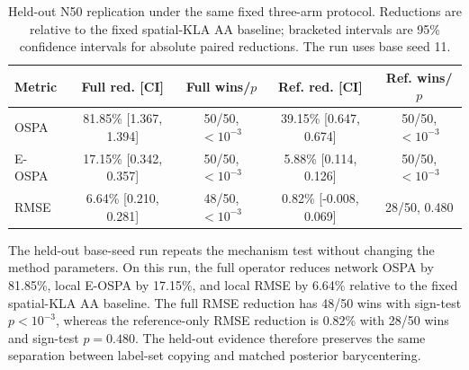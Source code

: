\begin{table}[t]
\caption{Held-out N50 replication under the same fixed three-arm protocol. Reductions are relative to the fixed spatial-KLA AA baseline; bracketed intervals are 95\% confidence intervals for absolute paired reductions. The run uses base seed 11.}
\label{tab:heldout}
\centering
\tablefont
\begin{tabular}{lcccc}
\toprule
Metric & Full red. [CI] & Full wins/$p$ & Ref. red. [CI] & Ref. wins/$p$\\
\midrule
OSPA & 81.85\% [1.367, 1.394] & 50/50, $<10^{-3}$ & 39.15\% [0.647, 0.674] & 50/50, $<10^{-3}$\\
E-OSPA & 17.15\% [0.342, 0.357] & 50/50, $<10^{-3}$ & 5.88\% [0.114, 0.126] & 50/50, $<10^{-3}$\\
RMSE & 6.64\% [0.210, 0.281] & 48/50, $<10^{-3}$ & 0.82\% [-0.008, 0.069] & 28/50, 0.480\\
\bottomrule
\end{tabular}
\end{table}

The held-out base-seed run repeats the mechanism test without changing the method parameters. On this run, the full operator reduces network OSPA by 81.85\%, local E-OSPA by 17.15\%, and local RMSE by 6.64\% relative to the fixed spatial-KLA AA baseline. The full RMSE reduction has 48/50 wins with sign-test $p<10^{-3}$, whereas the reference-only RMSE reduction is 0.82\% with 28/50 wins and sign-test $p=0.480$. The held-out evidence therefore preserves the same separation between label-set copying and matched posterior barycentering.
